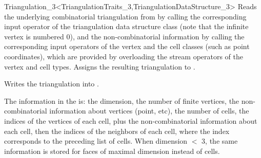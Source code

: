 \begin{ccRefClass}{Triangulation_3<TriangulationTraits_3,TriangulationDataStructure_3>}
{Reads the underlying combinatorial triangulation from  by
calling the corresponding input operator of the triangulation data
structure class (note that the infinite vertex is numbered 0), and the
non-combinatorial information by calling the corresponding input
operators of the vertex and the cell classes (such as point
coordinates), which are provided by overloading the stream operators
of the vertex and cell types.  Assigns the resulting triangulation to
.}

{Writes the triangulation  into .}

The information in the  is: the dimension, the number of
finite vertices, the non-combinatorial information about vertices (point,
etc), the number of cells, the indices of the vertices of each cell,
plus the non-combinatorial information about each cell, 
then the indices of the neighbors of each cell, where the index
corresponds to the preceding list of cells. When dimension $<$ 3, the
same information is stored for faces of maximal dimension instead of
cells. 

\ccSeeAlso

\\


\end{ccRefClass}
